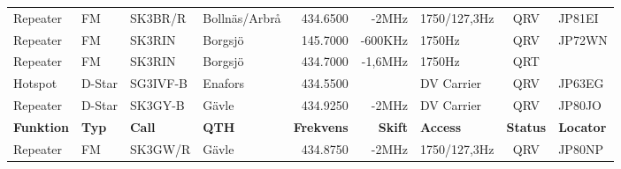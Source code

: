 \documentclass[10pt,swedish,a4paper,twoside]{article}
\begin{document}
\begin{landscape}
\begin{longtable}{llllrrlcl}
	Repeater          & FM           & SK3BR/R       & Bollnäs/Arbrå    &          434.6500 &          -2MHz & 1750/127,3Hz    &       QRV       & JP81EI           \\
	Repeater          & FM           & SK3RIN        & Borgsjö          &          145.7000 &        -600KHz & 1750Hz          &       QRV       & JP72WN           \\
	Repeater          & FM           & SK3RIN        & Borgsjö          &          434.7000 &        -1,6MHz & 1750Hz          &       QRT       &  \\
	Hotspot           & D-Star       & SG3IVF-B      & Enafors          &          434.5500 &                & DV Carrier      &       QRV       & JP63EG           \\
	Repeater          & D-Star       & SK3GY-B       & Gävle            &          434.9250 &          -2MHz & DV Carrier      &       QRV       & JP80JO           \\
\textbf{Funktion} & \textbf{Typ} & \textbf{Call} & \textbf{QTH}     & \textbf{Frekvens} & \textbf{Skift} & \textbf{Access} & \textbf{Status} & \textbf{Locator} \\ \hline
	Repeater          & FM           & SK3GW/R       & Gävle            &          434.8750 &          -2MHz & 1750/127,3Hz    &       QRV       & JP80NP           \\
		

\end{longtable}
\end{landscape}
\end{document}
